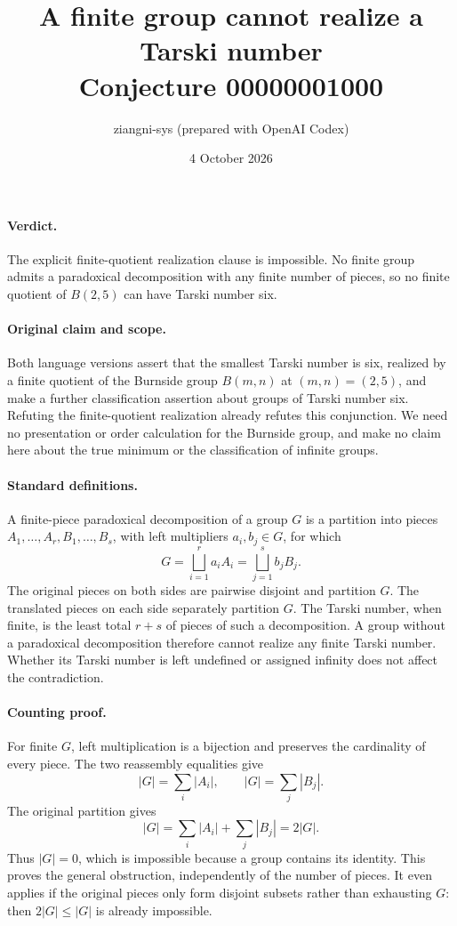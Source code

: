 \documentclass[11pt]{article}
\title{A finite group cannot realize a Tarski number\\Conjecture 00000001000}
\author{ziangni-sys (prepared with OpenAI Codex)}
\date{4 October 2026}
\begin{document}
\maketitle
\paragraph{Verdict.} The explicit finite-quotient realization clause is impossible. No finite group admits a paradoxical decomposition with any finite number of pieces, so no finite quotient of $B(2,5)$ can have Tarski number six.

\paragraph{Original claim and scope.} Both language versions assert that the smallest Tarski number is six, realized by a finite quotient of the Burnside group $B(m,n)$ at $(m,n)=(2,5)$, and make a further classification assertion about groups of Tarski number six. Refuting the finite-quotient realization already refutes this conjunction. We need no presentation or order calculation for the Burnside group, and make no claim here about the true minimum or the classification of infinite groups.

\paragraph{Standard definitions.} A finite-piece paradoxical decomposition of a group $G$ is a partition into pieces $A_1,\ldots,A_r,B_1,\ldots,B_s$, with left multipliers $a_i,b_j\in G$, for which
\[
G=\bigsqcup_{i=1}^r a_iA_i
 =\bigsqcup_{j=1}^s b_jB_j.
\]
The original pieces on both sides are pairwise disjoint and partition $G$. The translated pieces on each side separately partition $G$. The Tarski number, when finite, is the least total $r+s$ of pieces of such a decomposition. A group without a paradoxical decomposition therefore cannot realize any finite Tarski number. Whether its Tarski number is left undefined or assigned infinity does not affect the contradiction.

\paragraph{Counting proof.} For finite $G$, left multiplication is a bijection and preserves the cardinality of every piece. The two reassembly equalities give
\[
|G|=\sum_i|A_i|,\qquad |G|=\sum_j|B_j|.
\]
The original partition gives
\[
|G|=\sum_i|A_i|+\sum_j|B_j|=2|G|.
\]
Thus $|G|=0$, which is impossible because a group contains its identity. This proves the general obstruction, independently of the number of pieces. It even applies if the original pieces only form disjoint subsets rather than exhausting $G$: then $2|G|\leq|G|$ is already impossible.
\end{document}
